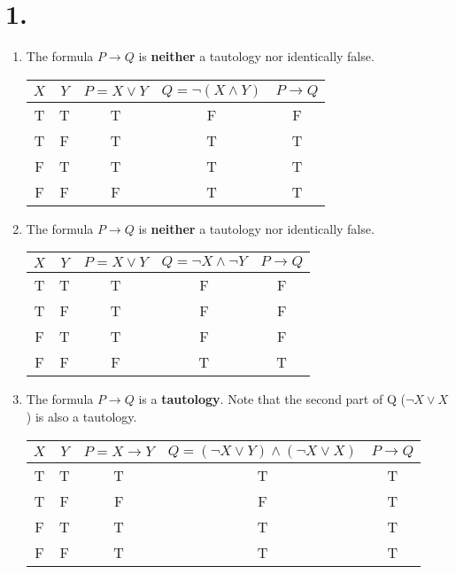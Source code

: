 \documentclass[12pt]{article}
\newcommand{\p}[1]{\item[\textnormal{(#1)}]}
\newenvironment{ps}
{\begin{enumerate}[leftmargin=0em, itemindent=1.5em]}
{\end{enumerate}}
\begin{document}
\section*{1.}
\begin{ps}

    \p{i} The formula \(P \rightarrow Q\) is \textbf{neither} a tautology nor identically
    false.
        \begin{center}
        \begin{tabular}{|c|c|c|c|c|}
        \hline
        $X$ & $Y$ & $P = X \vee Y$ & $Q = \neg (X \wedge Y)$ & $P \rightarrow Q$ \\
        \hline
        T & T & T & F & F \\
        T & F & T & T & T \\
        F & T & T & T & T \\
        F & F & F & T & T \\
        \hline
        \end{tabular}
        \end{center}

    \p{ii} The formula \(P \rightarrow Q\) is \textbf{neither} a tautology nor identically
    false.

        \begin{center}
        \begin{tabular}{|c|c|c|c|c|}
        \hline
        $X$ & $Y$ & $P = X \vee Y$ & $Q = \neg X \wedge \neg Y$ & $P \rightarrow Q$ \\
        \hline
        T & T & T & F & F \\
        T & F & T & F & F \\
        F & T & T & F & F \\
        F & F & F & T & T \\
        \hline
        \end{tabular}
        \end{center}

    \p{iii} The formula \(P \rightarrow Q\) is a \textbf{tautology}. Note that the second
    part of Q (\(\neg X \vee X\)) is also a tautology.

        \begin{center}
        \begin{tabular}{|c|c|c|c|c|}
        \hline
        $X$ & $Y$ & $P = X \rightarrow Y$ & $Q = (\neg X \vee Y) \wedge (\neg X \vee X)$ & $P \rightarrow Q$ \\
        \hline
        T & T & T & T & T \\
        T & F & F & F & T \\
        F & T & T & T & T \\
        F & F & T & T & T \\
        \hline
        \end{tabular}
        \end{center}


\end{ps}
\end{document}
